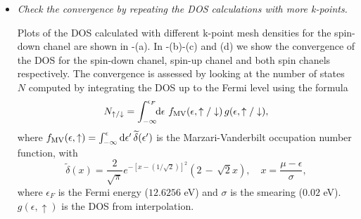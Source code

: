 \begin{itemize}
	\item {\it Check the convergence by repeating the DOS calculations with more k-points.}

	Plots of the DOS calculated with different k-point mesh densities for the spin-down chanel are shown in -(a). In -(b)-(c) and (d) we show the convergence of the DOS for the spin-down chanel, spin-up chanel and both spin chanels respectively. The convergence is assessed by looking at the number of states $N$ computed by integrating the DOS up to the Fermi level using the formula
	\begin{equation}
	N_{\uparrow/\downarrow} = \int_{-\infty}^{\epsilon_F}\!\! \mathrm{d}\epsilon\,\, f\tinysub{MV}(\epsilon,\uparrow/\downarrow)\, g(\epsilon,\uparrow/\downarrow), 
	\end{equation}
	where $f\tinysub{MV}(\epsilon,\uparrow) = \int_{-\infty}^{\epsilon} \mathrm{d}\epsilon'\,\widetilde{\delta}(\epsilon')$ is the Marzari-Vanderbilt occupation number function, with $$\widetilde{\delta}(x) = \frac{2}{\sqrt{\pi}}e^{-[x-(1/\sqrt{2})]^2}(2\,-\,\sqrt{2}x), \quad x=\frac{\mu-\epsilon}{\sigma},$$
	where $\epsilon_F$ is the Fermi energy ($12.6256$ eV) and $\sigma$ is the smearing ($0.02$ eV). $g(\epsilon,\uparrow)$ is the DOS from \Wannier{} interpolation. 



\end{itemize}
